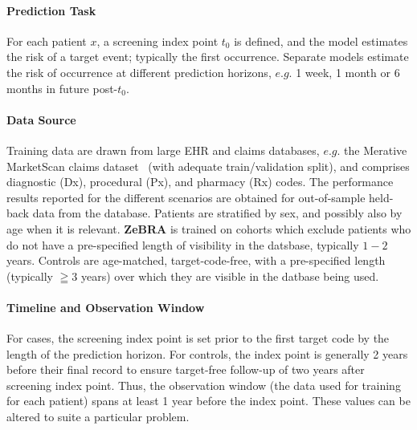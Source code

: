 \documentclass[onecolumn, compsoc,11pt]{IEEEtran}
\def\zebra{\textbf{ZeBRA}\xspace}
\def\zebra{\textbf{ZeBRA}\xspace}
\def\zcor{\zebra}
\begin{document}
\paragraph*{Prediction Task }

For each patient \( x \), a screening index point \( t_0 \) is defined, and the model estimates the risk of a  target event;  typically the first occurrence. Separate models estimate the risk of occurrence at different prediction horizons, $e.g.$  1 week, 1 month or 6 months in future post-\( t_0 \).

\paragraph*{Data Source} Training data are drawn from large EHR and claims databases, $e.g.$ the Merative MarketScan claims dataset~\cite{hansen2017truven} (with adequate train/validation split), and comprises diagnostic (Dx), procedural (Px), and pharmacy (Rx) codes. The performance results reported for the different scenarios are obtained for out-of-sample held-back data from the database.  Patients are stratified by sex, and possibly also by age when it is relevant. \zcor is trained on cohorts which exclude patients who do not have a pre-specified length of visibility in the datsbase, typically $1-2$ years. Controls are age-matched, target-code-free, with a pre-specified length (typically $\geqq 3 $ years) over which they are visible in the datbase being used.

\paragraph*{Timeline and Observation Window} For cases, the screening index point is set  prior to the first target code by the length of the prediction horizon. For controls, the index point is generally  2 years before their final record to ensure target-free follow-up of two years after screening index point. Thus, the observation window (the data used for training for each patient) spans at least 1 year  before the index point. These values can be altered to suite a particular problem.








\end{document}

